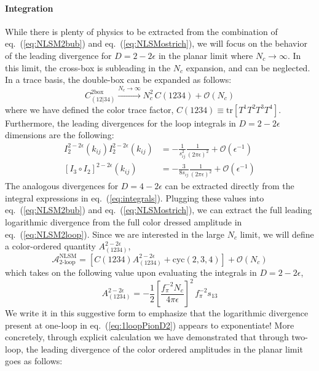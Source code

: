 \documentclass[11pt,letter]{article}
\def\eqn#1{eq.~(\ref{#1})}
\begin{document}
\paragraph{\textbf{Integration}} While there is plenty of physics to be extracted from the combination of \eqn{eq:NLSM2bub} and \eqn{eq:NLSMostrich}, we will focus on the behavior of the leading divergence for $D=2-2\epsilon$ in the planar limit where $N_c \rightarrow \infty$. In this limit, the cross-box is subleading in the $N_c$ expansion, and can be neglected. In a trace basis, the double-box can be expanded as follows:
\begin{equation}
C^{\text{2box}}_{(12|34)} \xrightarrow{N_c\rightarrow\infty } N_c^2\, C(1234) +\mathcal{O}(N_c)
\end{equation}
where we have defined the color trace factor, $C(1234)\equiv  \text{tr}[T^1T^2 T^3 T^4]$. Furthermore, the leading divergences for the loop integrals in $D=2-2\epsilon$ dimensions are the following:
\begin{align}
I_2^{2-2\epsilon}(k_{ij})I_2^{2-2\epsilon}(k_{ij}) &= -\frac{1}{s_{ij }^2}\frac{1}{(2\pi \epsilon)^2} + \mathcal{O}(\epsilon^{-1}) 
\\
 [I_3\circ I_2]^{2-2\epsilon}{(k_{ij})} &= -\frac{3}{8s_{ij }}\frac{1}{(2\pi \epsilon)^2} + \mathcal{O}(\epsilon^{-1}) 
\end{align}
The analogous divergences for $D=4-2\epsilon$ can be extracted directly from the integral expressions in \eqn{eq:integrals}. Plugging these values into \eqn{eq:NLSM2bub} and \eqn{eq:NLSMostrich}, we can extract the full leading logarithmic divergence from the full color dressed amplitude in \eqn{eq:NLSM2loop}. Since we are interested in the large $N_c$ limit, we will define a color-ordered quantity $A^{2-2\epsilon}_{(1234)}$, 
\begin{equation}
\mathcal{A}^{\text{NLSM}}_{\text{2-loop}} = \left[C(1234)A^{2-2\epsilon}_{(1234)}+\text{cyc}(2,3,4)\right] + \mathcal{O}(N_c)
\end{equation}
which takes on the following value upon evaluating the integrals in $D=2-2\epsilon$,
\begin{equation}
A^{2-2\epsilon}_{(1234)} = -\frac{1}{2}\left[\frac{f_{\pi}^{-2}N_c }{4\pi \epsilon}\right]^2 \,f_\pi^{-2}s_{13} 
\end{equation}
We write it in this suggestive form to emphasize that the logarithmic divergence present at one-loop in \eqn{eq:1loopPionD2} appears to exponentiate! More concretely, through explicit calculation we have demonstrated that through two-loop, the leading divergence of the color ordered amplitudes in the planar limit goes as follows:
\end{document}
